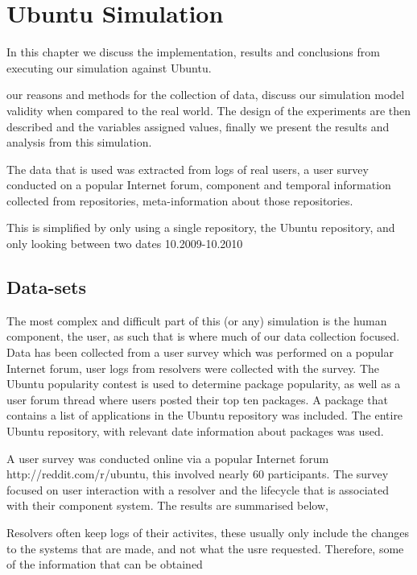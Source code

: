 
\chapter{Ubuntu Simulation}
In this chapter we discuss the implementation, results and conclusions from executing our simulation against Ubuntu.

{}our reasons and methods for the collection of data,
{}discuss our simulation model validity when compared to the real world.
{}The design of the experiments are then described and the variables assigned values,
{}finally we present the results and analysis from this simulation.

{}The data that is used was extracted from logs of real users, a user survey conducted on a popular Internet forum, 
{}component and temporal information collected from repositories, meta-information about those repositories.


{}This is simplified by only using a single repository, the Ubuntu repository, and only looking between two dates 10.2009-10.2010


\section{Data-sets}
The most complex and difficult part of this (or any) simulation is the human component, the user,
as such that is where much of our data collection focused.
Data has been collected from
a user survey which was performed on a popular Internet forum,
user logs from resolvers were collected with the survey.
The Ubuntu popularity contest is used to determine package popularity,
as well as a user forum thread where users posted their top ten packages.
A package that contains a list of applications in the Ubuntu repository was included.
The entire Ubuntu repository, with relevant date information about packages was used.

A user survey was conducted online via a popular Internet forum http://reddit.com/r/ubuntu, this involved nearly 60 participants. %
The survey focused on user interaction with a resolver and the lifecycle that is associated with their component system.
The results are summarised below, %

Resolvers often keep logs of their activites, these usually only include the changes to the systems that are made, and not what the usre requested.
Therefore, some of the information that can be obtained

